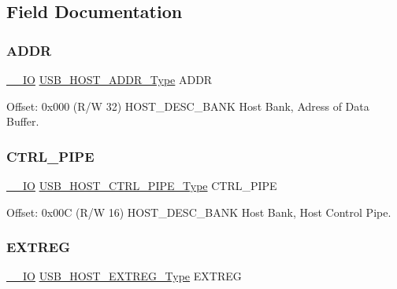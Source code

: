 \subsection{Field Documentation}
\mbox{\label{struct_usb_host_desc_bank_a6ab1cf26c24ddf3b4ba2535a30766035}} 
\subsubsection{\texorpdfstring{ADDR}{ADDR}}
{\footnotesize\ttfamily \mbox{\hyperlink{core__cm0plus_8h_aec43007d9998a0a0e01faede4133d6be}{\+\_\+\+\_\+\+IO}} \mbox{\hyperlink{union_u_s_b___h_o_s_t___a_d_d_r___type}{U\+S\+B\+\_\+\+H\+O\+S\+T\+\_\+\+A\+D\+D\+R\+\_\+\+Type}} A\+D\+DR}



Offset\+: 0x000 (R/W 32) H\+O\+S\+T\+\_\+\+D\+E\+S\+C\+\_\+\+B\+A\+NK Host Bank, Adress of Data Buffer. 

\mbox{\label{struct_usb_host_desc_bank_a3a056d7eb5f8f72be939feabd1d97b1c}} 
\subsubsection{\texorpdfstring{CTRL\_PIPE}{CTRL\_PIPE}}
{\footnotesize\ttfamily \mbox{\hyperlink{core__cm0plus_8h_aec43007d9998a0a0e01faede4133d6be}{\+\_\+\+\_\+\+IO}} \mbox{\hyperlink{union_u_s_b___h_o_s_t___c_t_r_l___p_i_p_e___type}{U\+S\+B\+\_\+\+H\+O\+S\+T\+\_\+\+C\+T\+R\+L\+\_\+\+P\+I\+P\+E\+\_\+\+Type}} C\+T\+R\+L\+\_\+\+P\+I\+PE}



Offset\+: 0x00C (R/W 16) H\+O\+S\+T\+\_\+\+D\+E\+S\+C\+\_\+\+B\+A\+NK Host Bank, Host Control Pipe. 

\mbox{\label{struct_usb_host_desc_bank_ac7bddd966561e14ba17477ab1eeaaff3}} 
\subsubsection{\texorpdfstring{EXTREG}{EXTREG}}
{\footnotesize\ttfamily \mbox{\hyperlink{core__cm0plus_8h_aec43007d9998a0a0e01faede4133d6be}{\+\_\+\+\_\+\+IO}} \mbox{\hyperlink{union_u_s_b___h_o_s_t___e_x_t_r_e_g___type}{U\+S\+B\+\_\+\+H\+O\+S\+T\+\_\+\+E\+X\+T\+R\+E\+G\+\_\+\+Type}} E\+X\+T\+R\+EG}



